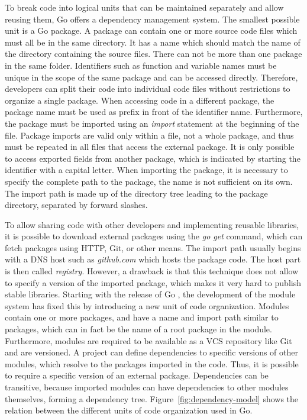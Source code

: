 To break code into logical units that can be maintained separately and allow reusing them, Go offers a dependency
management system.
The smallest possible unit is a Go package.
A package can contain one or more source code files which must all be in the same directory.
It has a name which should match the name of the directory containing the source files.
There can not be more than one package in the same folder.
Identifiers such as function and variable names must be unique in the scope of the same package and can be accessed
directly.
Therefore, developers can split their code into individual code files without restrictions to organize a single package.
When accessing code in a different package, the package name must be used as prefix in front of the identifier name.
Furthermore, the package must be imported using an \textit{import} statement at the beginning of the file.
Package imports are valid only within a file, not a whole package, and thus must be repeated in all files that access
the external package.
It is only possible to access exported fields from another package, which is indicated by starting the identifier with
a capital letter.
When importing the package, it is necessary to specify the complete path to the package, the name is not sufficient on
its own.
The import path is made up of the directory tree leading to the package directory, separated by forward slashes.

To allow sharing code with other developers and implementing reusable libraries, it is possible to download external
packages using the \textit{go get} command, which can fetch packages using \acrshort{HTTP}, Git, or other means.
The import path usually begins with a \acrshort{DNS} host such as \textit{github.com} which hosts the package code.
The host part is then called \textit{registry}.
However, a drawback is that this technique does not allow to specify a version of the imported package, which makes it
very hard to publish stable libraries.
Starting with the release of Go , the development of the module system has fixed this by introducing a
new unit of code organization.
Modules contain one or more packages, and have a name and import path similar to packages, which can in fact be the name
of a root package in the module.
Furthermore, modules are required to be available as a \acrshort{VCS} repository like Git and are versioned.
A project can define dependencies to specific versions of other modules, which resolve to the packages imported in the
code.
Thus, it is possible to require a specific version of an external package.
Dependencies can be transitive, because imported modules can have dependencies to other modules themselves,
forming a dependency tree.
Figure~\ref{fig:dependency-model} shows the relation between the different units of code organization used in Go.

